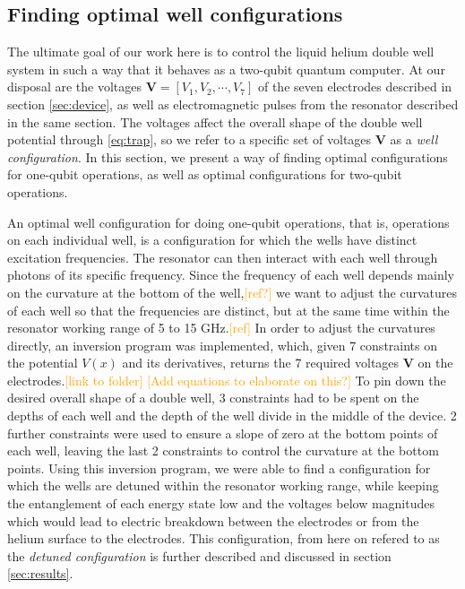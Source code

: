 \documentclass[twocolumn,superscriptaddress,unsortedaddress,
 amsmath,amssymb,
 aps,
]{revtex4-2}
\newcommand{\may}[1]{\textcolor{orange}{#1}}
\begin{document}
    \subsection{Finding optimal well configurations}
        
        The ultimate goal of our work here is to control the liquid helium double well system in such a way that it behaves as a two-qubit quantum computer. At our disposal are the voltages $\boldsymbol{V}=[V_1,V_2,\cdots,V_7]$ of the seven electrodes described in section \ref{sec:device}, as well as electromagnetic pulses from the resonator described in the same section. The voltages affect the overall shape of the double well potential through \eqref{eq:trap}, so we refer to a specific set of voltages $\boldsymbol{V}$ as a \textit{well configuration}. In this section, we present a way of finding optimal configurations for one-qubit operations, as well as optimal configurations for two-qubit operations.
        
        An optimal well configuration for doing one-qubit operations, that is, operations on each individual well, is a configuration for which the wells have distinct excitation frequencies. The resonator can then interact with each well through photons of its specific frequency. Since the frequency of each well depends mainly on the curvature at the bottom of the well,\may{[ref?]} we want to adjust the curvatures of each well so that the frequencies are distinct, but at the same time within the resonator working range of 5 to 15 GHz.\may{[ref]} In order to adjust the curvatures directly, 
        an inversion program was implemented, which, given 7 constraints on the potential $V(x)$ and its derivatives, returns the 7 required voltages $\boldsymbol{V}$ on the electrodes.\may{[link to folder]} \may{[Add equations to elaborate on this?]} To pin down the desired overall shape of a double well, 3 constraints had to be spent on the depths of each well and the depth of the well divide in the middle of the device. 2 further constraints were used to ensure a slope of zero at the bottom points of each well, leaving the last 2 constraints to control the curvature at the bottom points. Using this inversion program, we were able to find a configuration for which the wells are detuned within the resonator working range, while keeping the entanglement of each energy state low and the voltages below magnitudes which would lead to electric breakdown between the electrodes or from the helium surface to the electrodes. This configuration, from here on refered to as the \textit{detuned configuration} is further described and discussed in section \ref{sec:results}.
        
\end{document}
